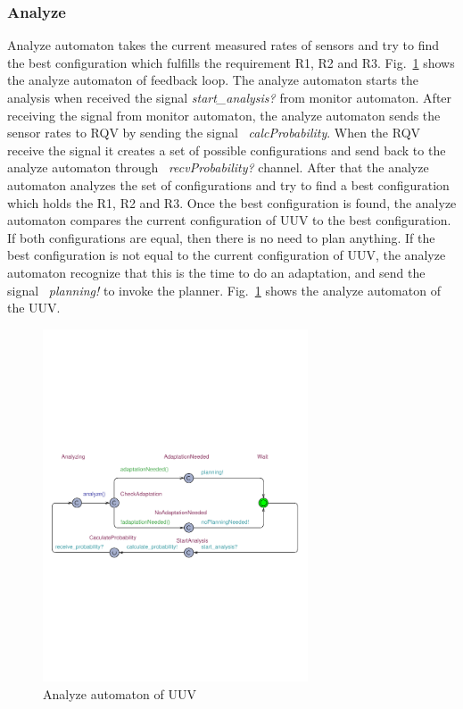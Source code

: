 \subsubsection{Analyze}
Analyze automaton takes the current measured rates of sensors and try to find the best configuration which fulfills the requirement R1, R2 and R3. Fig.~\ref{fig:analysis-automaton} shows the analyze automaton of feedback loop. The analyze automaton starts the analysis when received the signal \textit{start\_analysis?} from monitor automaton. After receiving the signal from monitor automaton, the analyze automaton sends the sensor rates to RQV by sending the signal ~\textit{calcProbability}.
When the RQV receive the signal it creates a set of possible configurations and send back to the analyze automaton through ~\textit{recvProbability?} channel. After that the analyze automaton analyzes the set of configurations and try to find a best configuration which holds the R1, R2 and R3. Once the best configuration is found, the analyze automaton compares the current configuration of UUV to the best configuration. If both configurations are equal, then there is no need to plan anything. If the best configuration is not equal to the current configuration of UUV, the analyze automaton recognize that this is the time to do an adaptation, and send the signal ~\textit{planning!} to invoke the planner. Fig.~\ref{fig:analysis-automaton} shows the analyze automaton of the UUV.


\begin{figure}[t]
	\centering
	\includegraphics[width=0.7\textwidth]{figures/Analyzer}
	\caption{Analyze automaton of UUV}\label{fig:analysis-automaton}
	
	\vspace*{-2mm}
\end{figure}


